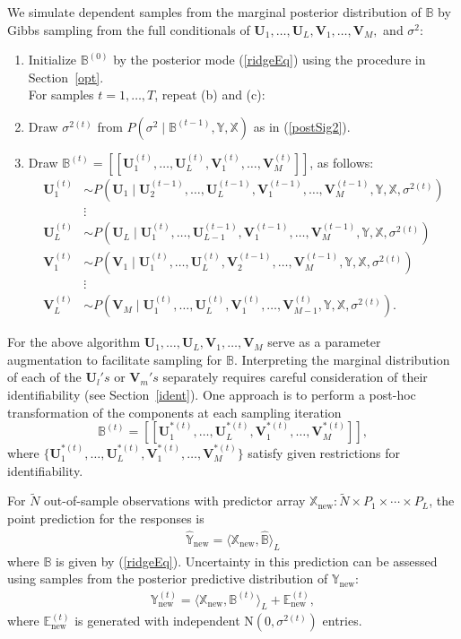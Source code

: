 \documentclass[12pt]{article}
\def\ctimes{\times \cdots \times}
\def\U{\mathbf{U}}
\def\XX{\mathbb{X}}
\def\YY{\mathbb{Y}}
\def\EE{\mathbb{E}}
\def\V{\mathbf{V}}
\def\BB{\mathbb{B}}
\def\new{\mbox{new}}
\def\tp#1{[\![#1]\!]}
\newcommand{\tprod}[3] {
  \langle #1, #2 \rangle_{#3}}
\begin{document}
We simulate dependent samples from the marginal posterior distribution of $\BB$ by Gibbs sampling from the full conditionals of $\U_1,\hdots,\U_L, \V_1,\hdots,\V_M,$ and $\sigma^2$:
\begin{enumerate}
\item Initialize $\BB^{(0)}$ by the posterior mode (\ref{ridgeEq}) using the procedure in Section~\ref{opt}. \\

For samples $t=1,\hdots,T$, repeat (b) and (c):\\
\item Draw $\sigma^{2 (t)}$ from $P \left(\sigma^2 \mid \BB^{(t-1)}, \YY, \XX \right)$ as in (\ref{postSig2}).   
\item Draw $\BB^{(t)} = \tp{\U_1^{(t)},\hdots,\U_L^{(t)}, \V_1^{(t)},\hdots,\V_M^{(t)}}$, as follows:  
\begin{align*}
\U_1^{(t)} &\sim P \left(\U_1 \mid \U_2^{(t-1)}, \hdots,\U_L^{(t-1)}, \V_1^{(t-1)},\hdots,\V_M^{(t-1)}, \YY, \XX, \sigma^{2 (t)} \right)\\
& \vdots  \\ 
\U_L^{(t)} &\sim P \left(\U_L \mid \U_1^{(t)}, \hdots,\U_{L-1}^{(t-1)}, \V_1^{(t-1)},\hdots,\V_M^{(t-1)}, \YY, \XX, \sigma^{2 (t)} \right)  \\
\V_1^{(t)} &\sim P \left(\V_1 \mid \U_1^{(t)}, \hdots,\U_L^{(t)}, \V_2^{(t-1)},\hdots,\V_M^{(t-1)}, \YY, \XX, \sigma^{2 (t)} \right) \\
&  \vdots  \\
\V_L^{(t)} &\sim P \left(\V_M \mid \U_1^{(t)}, \hdots,\U_L^{(t)}, \V_1^{(t)},\hdots,\V_{M-1}^{(t)}, \YY, \XX, \sigma^{2 (t)} \right) .	
\end{align*}
 \end{enumerate}  
For the above algorithm $\U_1,\hdots,\U_L, \V_1,\hdots,\V_M$ serve as a parameter augmentation to facilitate sampling for $\BB$.  Interpreting the marginal distribution of each of the $\U_l's$ or $\V_m's$ separately requires careful consideration of their identifiability (see Section~\ref{ident}).  One approach is to perform a post-hoc transformation of the components at each sampling iteration \[\BB^{(t)} = \tp{\U_1^{*(t)},\hdots,\U_L^{*(t)}, \V_1^{*(t)},\hdots,\V_M^{*(t)}},\] where $\{\U_1^{*(t)},\hdots,\U_L^{*(t)}, \V_1^{*(t)},\hdots,\V_M^{*(t)}\}$ satisfy given restrictions for identifiability.  

For $\tilde{N}$ out-of-sample observations with predictor array $\XX_{\new}: \tilde{N} \times P_1 \ctimes P_L$, the point prediction for the responses is
\begin{align}
\hat{\YY}_{\new} = \tprod{\XX_{\new}}{\hat{\BB}}{L}     \label{pointPred} 
\end{align}
where $\BB$ is given by (\ref{ridgeEq}).  Uncertainty in this prediction can be assessed using samples from the posterior predictive distribution of $\YY_{\new}$: 
\begin{align}
\YY_{\new}^{(t)} = \tprod{\XX_{\new}}{\BB^{(t)}}{L} +\EE_{\new}^{(t)},     \label{postPred} 
\end{align}
where $\EE_{\new}^{(t)}$ is generated with independent N$(0,\sigma^{2 (t)})$ entries.  
\end{document}
